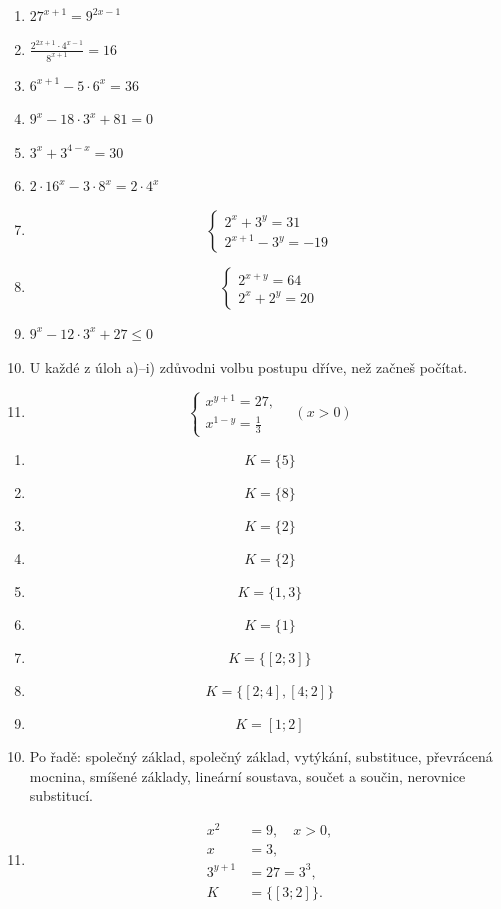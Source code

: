\documentclass[11pt,a4paper]{article}
\begin{document}
\begin{zadaniReseniBox}[title={Domácí úkol}]
\begin{enumerate}[label=\alph*)]
\item $27^{x+1}=9^{2x-1}$
\item $\frac{2^{2x+1}\cdot4^{x-1}}{8^{x+1}}=16$
\item $6^{x+1}-5\cdot6^x=36$
\item $9^x-18\cdot3^x+81=0$
\item $3^x+3^{4-x}=30$
\item $2\cdot16^x-3\cdot8^x=2\cdot4^x$
\item \[\begin{cases}2^x+3^y=31\\2^{x+1}-3^y=-19\end{cases}\]
\item \[\begin{cases}2^{x+y}=64\\2^x+2^y=20\end{cases}\]
\item $9^x-12\cdot3^x+27\le0$
\item U každé z úloh a)--i) zdůvodni volbu postupu dříve, než začneš počítat.
\item \[ \begin{cases}x^{y+1}=27,\\x^{1-y}=\frac{1}{3}\end{cases}\quad(x>0) \]
\end{enumerate}
\tcblower
\setlength{\abovedisplayskip}{2pt}\setlength{\belowdisplayskip}{2pt}
\setlength{\abovedisplayshortskip}{2pt}\setlength{\belowdisplayshortskip}{2pt}
\begin{enumerate}[label=\alph*)]
\item \[K=\{5\}\]
\item \[K=\{8\}\]
\item \[K=\{2\}\]
\item \[K=\{2\}\]
\item \[K=\{1,3\}\]
\item \[K=\{1\}\]
\item \[K=\{[2;3]\}\]
\item \[K=\{[2;4],[4;2]\}\]
\item \[K=[1;2]\]
\item Po řadě: společný základ, společný základ, vytýkání, substituce, převrácená mocnina, smíšené základy, lineární soustava, součet a součin, nerovnice substitucí.
\item \[\begin{aligned}x^{2}&=9,\quad x>0,\\x&=3,\\3^{y+1}&=27=3^3,\\K&=\{[3;2]\}.\end{aligned}\]
\end{enumerate}
\end{zadaniReseniBox}
\end{document}
